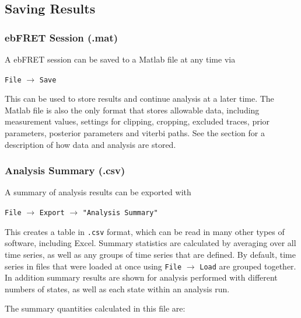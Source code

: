 \documentclass[12pt,article,oldfontcommands]{memoir}
\newcommand{\indt}{\qquad}
\begin{document}
\subsection{Saving Results}
\label{sec:save-export}

\subsubsection{ebFRET Session (.mat)}

A ebFRET session can be saved to a Matlab file at any time via 

\indt\texttt{File} $\to$ \texttt{Save}

This can be used to store results and continue analysis at a later time. The Matlab file is also the only format that stores allowable data, including measurement values, settings for clipping, cropping, excluded traces, prior parameters, posterior parameters and viterbi paths. See the \emph{} section for a description of how data and analysis are stored.

\subsubsection{Analysis Summary (.csv)}

A summary of analysis results can be exported with 

\indt\texttt{File} $\to$ \texttt{Export} $\to$ \texttt{"Analysis Summary"}

This creates a table in \texttt{.csv} format, which can be read in many other types of software, including Excel. Summary statistics are calculated by averaging over all time series, as well as any groups of time series that are defined. By default, time series in files that were loaded at once using \texttt{File} $\to$ \texttt{Load} are grouped together. In addition summary results are shown for analysis performed with different numbers of states, as well as each state within an analysis run. 

The summary quantities calculated in this file are:
\end{document}
